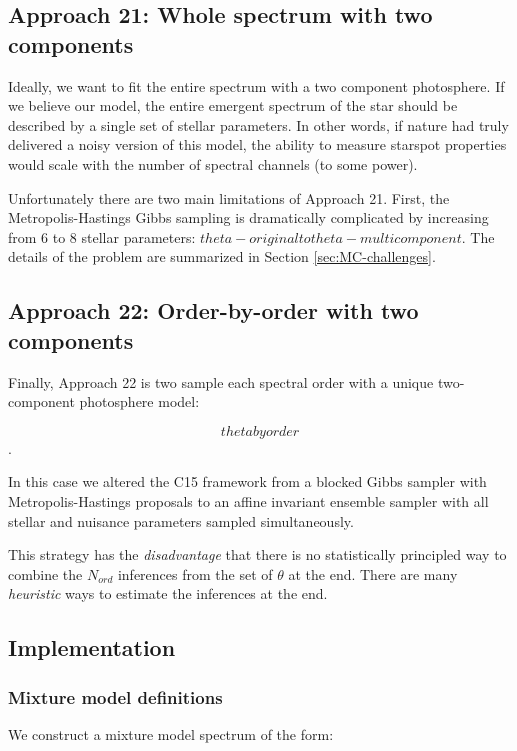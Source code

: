 \documentclass[twocolumn]{emulateapj}%
\newcommand{\iancze}{{\sc C15 }}
\begin{document}
\subsection{Approach 21: Whole spectrum with two components}
\label{sec:approach21}

Ideally, we want to fit the entire spectrum with a two component photosphere.  If we believe our model, the entire emergent spectrum of the star should be described by a single set of stellar parameters.  In other words, if nature had truly delivered a noisy version of this model, the ability to measure starspot properties would scale with the number of spectral channels (to some power).

Unfortunately there are two main limitations of Approach 21.  First, the Metropolis-Hastings Gibbs sampling is dramatically complicated by increasing from 6 to 8 stellar parameters: $theta-original to theta-multicomponent$.  The details of the problem are summarized in Section \ref{sec:MC-challenges}.


\subsection{Approach 22: Order-by-order with two components}
\label{sec:approach22}

Finally, Approach 22 is two sample each spectral order with a unique two-component photosphere model: 

$$ theta by order$$. 

In this case we altered the \iancze framework from a blocked Gibbs sampler with Metropolis-Hastings proposals to an affine invariant ensemble sampler with all stellar and nuisance parameters sampled simultaneously.  

This strategy has the \emph{disadvantage} that there is no statistically principled way to combine the $N_{ord}$ inferences from the set of $\theta$ at the end.  There are many \emph{heuristic} ways to estimate the inferences at the end.  


\subsection{Implementation}

\subsubsection{Mixture model definitions}

We construct a mixture model spectrum of the form:
\end{document}
